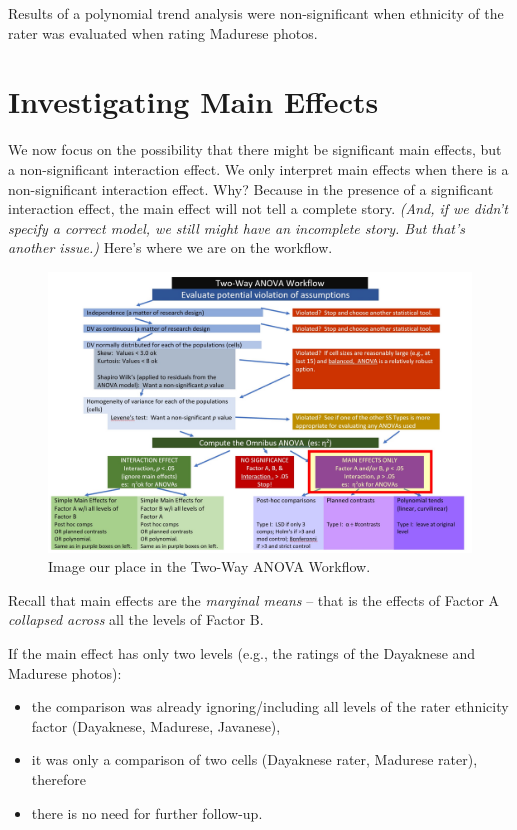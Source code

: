 \documentclass[
  11pt,
]{book}
\providecommand{\tightlist}{%
  \setlength{\itemsep}{0pt}\setlength{\parskip}{0pt}}
\begin{document}
Results of a polynomial trend analysis were non-significant when ethnicity of the rater was evaluated when rating Madurese photos.

\hypertarget{investigating-main-effects}{%
\section{Investigating Main Effects}\label{investigating-main-effects}}

We now focus on the possibility that there might be significant main effects, but a non-significant interaction effect. We only interpret main effects when there is a non-significant interaction effect. Why? Because in the presence of a significant interaction effect, the main effect will not tell a complete story. \emph{(And, if we didn't specify a correct model, we still might have an incomplete story. But that's another issue.)} Here's where we are on the workflow.

\begin{figure}
\centering
\includegraphics{images/factorial/WayWrkFlw_Main.jpg}
\caption{Image our place in the Two-Way ANOVA Workflow.}
\end{figure}

Recall that main effects are the \emph{marginal means} -- that is the effects of Factor A \emph{collapsed across} all the levels of Factor B.

If the main effect has only two levels (e.g., the ratings of the Dayaknese and Madurese photos):

\begin{itemize}
\tightlist
\item
  the comparison was already ignoring/including all levels of the rater ethnicity factor (Dayaknese, Madurese, Javanese),
\item
  it was only a comparison of two cells (Dayaknese rater, Madurese rater), therefore
\item
  there is no need for further follow-up.
\end{itemize}
\end{document}
